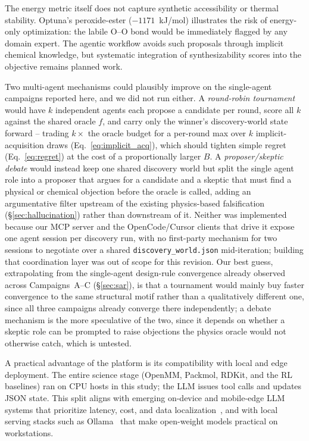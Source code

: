 \documentclass[twocolumn]{fairmeta}
\begin{document}
The energy metric itself does not capture synthetic accessibility or thermal stability.
Optuna's peroxide-ester ($-1171$~kJ/mol) illustrates the risk of energy-only optimization: the labile O--O bond would be immediately flagged by any domain expert.
The agentic workflow avoids such proposals through implicit chemical knowledge, but systematic integration of synthesizability scores into the objective remains planned work.

Two multi-agent mechanisms could plausibly improve on the single-agent campaigns reported here, and we did not run either.
A \emph{round-robin tournament} would have $k$ independent agents each propose a candidate per round, score all $k$ against the shared oracle $f$, and carry only the winner's discovery-world state forward -- trading $k\times$ the oracle budget for a per-round max over $k$ implicit-acquisition draws (Eq.~\ref{eq:implicit_acq}), which should tighten simple regret (Eq.~\ref{eq:regret}) at the cost of a proportionally larger $B$.
A \emph{proposer/skeptic debate} would instead keep one shared discovery world but split the single agent role into a proposer that argues for a candidate and a skeptic that must find a physical or chemical objection before the oracle is called, adding an argumentative filter upstream of the existing physics-based falsification (\S\ref{sec:hallucination}) rather than downstream of it.
Neither was implemented because our MCP server and the OpenCode/Cursor clients that drive it expose one agent session per discovery run, with no first-party mechanism for two sessions to negotiate over a shared \texttt{discovery\_world.json} mid-iteration; building that coordination layer was out of scope for this revision.
Our best guess, extrapolating from the single-agent design-rule convergence already observed across Campaigns~A--C (\S\ref{sec:sar}), is that a tournament would mainly buy faster convergence to the same structural motif rather than a qualitatively different one, since all three campaigns already converge there independently; a debate mechanism is the more speculative of the two, since it depends on whether a skeptic role can be prompted to raise objections the physics oracle would not otherwise catch, which is untested.

A practical advantage of the platform is its compatibility with local and edge deployment.
The entire science stage (OpenMM, Packmol, RDKit, and the RL baselines) ran on CPU hosts in this study; the LLM issues tool calls and updates JSON state.
This split aligns with emerging on-device and mobile-edge LLM systems that prioritize latency, cost, and data localization~\cite{xu2024ondevice,qu2024mobileedge}, and with local serving stacks such as Ollama~\cite{ollama2023} that make open-weight models practical on workstations.
\end{document}
